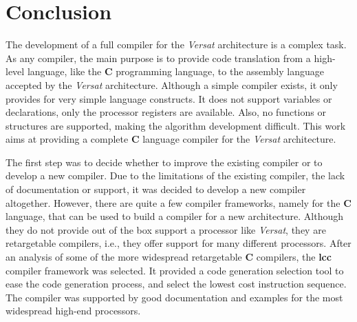 
\chapter{Conclusion}
\label{chapter:conclusao}

The development of a full compiler for the {\it Versat} architecture is a
complex task. As any compiler, the main purpose is to provide code translation
from a high-level language, like the {\bf C} programming language, to the
assembly language accepted by the {\it Versat} architecture.  Although a simple
compiler exists, it only provides for very simple language constructs.  It does
not support variables or declarations, only the processor registers are
available.  Also, no functions or structures are supported, making the algorithm
development difficult.  This work aims at providing a complete {\bf C} language
compiler for the {\it Versat} architecture.

The first step was to decide whether to improve the existing compiler or to
develop a new compiler. Due to the limitations of the existing compiler, the
lack of documentation or support, it was decided to develop a new compiler
altogether. However, there are quite a few compiler frameworks, namely for the
{\bf C} language, that can be used to build a compiler for a new architecture.
Although they do not provide out of the box support a processor like
{\it Versat}, they are retargetable compilers, i.e., they offer support for
many different processors.
After an analysis of some of the more widespread retargetable {\bf
  C} compilers, the {\bf lcc} compiler framework was selected. It provided a
code generation selection tool to ease the code generation process, and select
the lowest cost instruction sequence. The compiler was supported by good
documentation and examples for the most widespread high-end processors.

